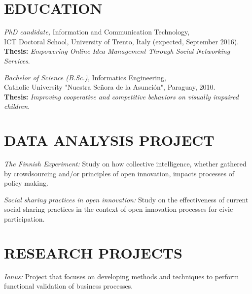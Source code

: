 \documentclass[line,margin]{res}
\begin{document}

\address{Via delle Cave 13, Trento, Italy}
\address{jorgesaldivar@gmail.com}

\begin{resume}
 
 
\section{EDUCATION} 
	{\sl PhD candidate,} Information and Communication Technology,\\ 
ICT Doctoral School, University of Trento, Italy (expected, September 2016).\\
	{\bf Thesis:} \emph{Empowering Online Idea Management Through Social Networking Services}.
                
	{\sl Bachelor of Science (B.Sc.),} Informatics Engineering,\\ 
    Catholic University "Nuestra Se\~nora de la Asunci\'on", Paraguay, 2010.\\
    {\bf Thesis:} \emph{Improving cooperative and competitive behaviors on visually impaired children}.
 
\section{DATA ANALYSIS PROJECT}
	{\sl The Finnish Experiment:} Study on how collective intelligence, whether gathered by crowdsourcing and/or principles of open innovation, impacts processes of policy making.
	
	{\sl Social sharing practices in open innovation:} Study on the effectiveness of current social sharing practices in the context of open innovation processes for civic participation.
	
 
\section{RESEARCH PROJECTS}
	{\sl Ianus:} Project that focuses on developing methods and techniques to perform functional validation of business processes.


\end{resume}
\end{document}
